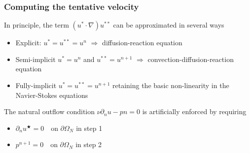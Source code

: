 \begin{frame}
  \frametitle{Computing the tentative velocity}
  In principle, the term  $(u^{\ast} \cdot \nabla)u^{\ast\ast}$ can be
  approximated in several ways
  \begin{itemize}
    \item Explicit: $u^{\ast} = u^{\ast \ast} = u^{n}$
      $\Rightarrow$ diffusion-reaction equation
    \item Semi-implicit $u^{\ast} = u^{n}$ and  $u^{\ast \ast} =
      u^{n+1}$ $\Rightarrow$ convection-diffusion-reaction equation
    \item Fully-implicit $u^{\ast} = u^{\ast \ast} = u^{n+1}$ retaining
      the basic non-linearity in the Navier-Stokes equations
  \end{itemize}
  The natural outflow condition $\nu \partial_n u - pn = 0$ is
  artificially enforced by requiring
  \begin{itemize}
    \item $\partial_n u^{\bigstar}  = 0 \quad \text{on } \partial
      \Omega_N$ in step 1
    \item $p^{n+1} = 0 \quad \text{on } \partial \Omega_N$ in step 2
  \end{itemize}
\end{frame}
